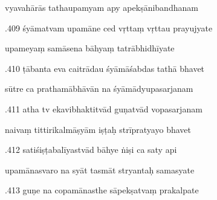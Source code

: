 \documentclass[article,12pt,a4paper]{memoir}%
\newcounter{parCount}
\begin{document}
	  
	  \pstart \leavevmode%
	vyavahārās tathaupamyam apy apekṣānibandhanam 
	{}
	\pend%
      

	  
	  \pstart {}.409 śyāmatvam upamāne ced vṛttaṃ vṛttau prayujyate 
	{}
	\pend%
      

	  
	  \pstart \leavevmode%
	upameyaṃ samāsena bāhyaṃ tatrābhidhīyate 
	{}
	\pend%
      

	  
	  \pstart {}.410 ṭābanta eva caitrādau śyāmāśabdas tathā bhavet 
	{}
	\pend%
      

	  
	  \pstart \leavevmode%
	sūtre ca prathamābhāvān na śyāmādyupasarjanam 
	{}
	\pend%
      

	  
	  \pstart {}.411 atha tv ekavibhaktitvād guṇatvād vopasarjanam 
	{}
	\pend%
      

	  
	  \pstart \leavevmode%
	naivaṃ tittirikalmāṣyām iṣṭaḥ strīpratyayo bhavet 
	{}
	\pend%
      

	  
	  \pstart {}.412 satiśiṣṭabalīyastvād bāhye ṅiṣi ca saty api 
	{}
	\pend%
      

	  
	  \pstart \leavevmode%
	upamānasvaro na syāt tasmāt stryantaḥ samasyate 
	{}
	\pend%
      

	  
	  \pstart {}.413 guṇe na copamānasthe sāpekṣatvaṃ prakalpate 
	{}
	\pend%
      
\end{document}
